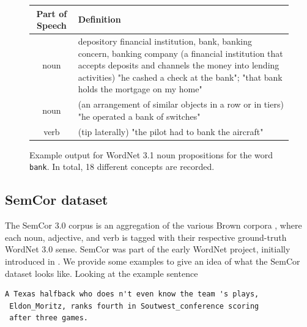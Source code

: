 \documentclass[a4paper,12pt,oneside,openright]{report}
\begin{document}
\begin{figure}
\begin{center}
\begin{tabular}{ | c | p{11cm} | } 
 \hline
 Part of Speech & Definition \\  
 \hline 
noun     & depository financial institution, bank, banking concern, banking company (a financial institution that accepts deposits and channels the money into lending activities) "he cashed a check at the bank"; "that bank holds the mortgage on my home" \\ 
 noun     & (an arrangement of similar objects in a row or in tiers) "he operated a bank of switches"  \\ 
verb & (tip laterally) "the pilot had to bank the aircraft" \\ 
 \hline
\end{tabular}
\end{center}
\caption{Example output for WordNet 3.1 noun propositions for the word \texttt{bank}. In total, 18 different concepts are recorded.}
\label{fig:bank_synset}
\end{figure}

\subsection{SemCor dataset}

The SemCor 3.0 corpus is an aggregation of the various Brown corpora \cite{francis64}, where each noun, adjective, and verb is tagged with their respective ground-truth WordNet 3.0 sense.
SemCor was part of the early WordNet project, initially introduced in \cite{miller94}.
We provide some examples to give an idea of what the SemCor dataset looks like.
Looking at the example sentence

\begin{tcolorbox}
\begin{verbatim}
A Texas halfback who does n't even know the team 's plays,
 Eldon_Moritz, ranks fourth in Soutwest_conference scoring 
 after three games.
\end{verbatim}
\end{tcolorbox}

%
\end{document}
